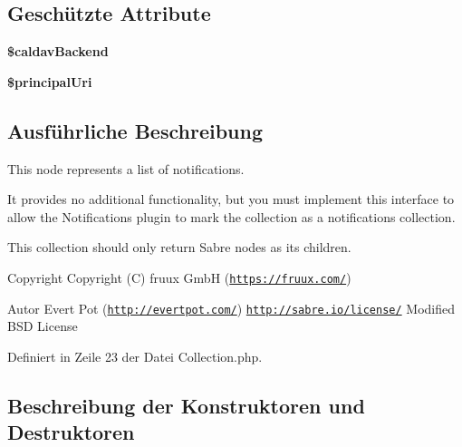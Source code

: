 \subsection*{Geschützte Attribute}
\begin{DoxyCompactItemize}
\item 
\mbox{\label{class_sabre_1_1_cal_d_a_v_1_1_notifications_1_1_collection_a73eb2830e1415d608fcdcb2a168754fb}} 
{\bfseries \$caldav\+Backend}
\item 
\mbox{\label{class_sabre_1_1_cal_d_a_v_1_1_notifications_1_1_collection_a7a42ba6c41173c84e91fba58090945b5}} 
{\bfseries \$principal\+Uri}
\end{DoxyCompactItemize}


\subsection{Ausführliche Beschreibung}
This node represents a list of notifications.

It provides no additional functionality, but you must implement this interface to allow the Notifications plugin to mark the collection as a notifications collection.

This collection should only return Sabre nodes as its children.

\begin{DoxyCopyright}{Copyright}
Copyright (C) fruux GmbH (\href{https://fruux.com/}{\tt https\+://fruux.\+com/}) 
\end{DoxyCopyright}
\begin{DoxyAuthor}{Autor}
Evert Pot (\href{http://evertpot.com/}{\tt http\+://evertpot.\+com/})  \href{http://sabre.io/license/}{\tt http\+://sabre.\+io/license/} Modified B\+SD License 
\end{DoxyAuthor}


Definiert in Zeile 23 der Datei Collection.\+php.



\subsection{Beschreibung der Konstruktoren und Destruktoren}
\mbox{\label{class_sabre_1_1_cal_d_a_v_1_1_notifications_1_1_collection_a8bf6d75629c075e08230aeffee783aff}} 
